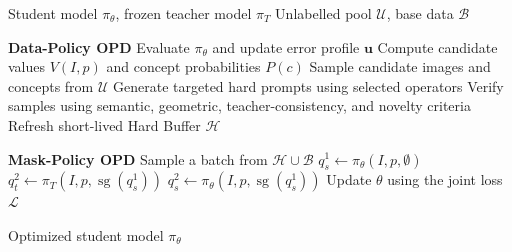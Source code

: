 \begin{algorithm}[H]
\caption{Dual-Level On-Policy Distillation (DL-OPD)}
\label{alg:dlopd}
\begin{algorithmic}[1]

\Require Student model $\pi_\theta$, frozen teacher model $\pi_T$
\Require Unlabelled pool $\mathcal{U}$, base data $\mathcal{B}$


    \State \textbf{Data-Policy OPD}
    \State Evaluate $\pi_\theta$ and update error profile $\mathbf{u}$
    \State Compute candidate values $V(I,p)$ and concept probabilities
           $P(c)$
    \State Sample candidate images and concepts from $\mathcal{U}$
    \State Generate targeted hard prompts using selected operators
    \State Verify samples using semantic, geometric,
           teacher-consistency, and novelty criteria
    \State Refresh short-lived Hard Buffer $\mathcal{H}$


        \State \textbf{Mask-Policy OPD}
        \State Sample a batch from $\mathcal{H}\cup\mathcal{B}$
        \State $q_s^{1} \gets \pi_\theta(I,p,\emptyset)$
        \State $q_t^{2} \gets
        \pi_T(I,p,\operatorname{sg}(q_s^{1}))$
        \State $q_s^{2} \gets
        \pi_\theta(I,p,\operatorname{sg}(q_s^{1}))$
        \State Update $\theta$ using the joint loss $\mathcal{L}$

    \EndFor

\EndFor

\State \Return Optimized student model $\pi_\theta$

\end{algorithmic}
\end{algorithm}